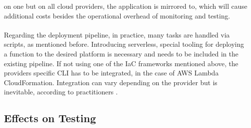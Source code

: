 \documentclass[a4paper,twoside,11pt, pagesize]{scrartcl}
\begin{document}
\begin{spacing}{1.2}
on one but on all cloud providers, the application is mirrored to, which will cause additional costs besides the operational overhead of monitoring and testing.\\\\ Regarding the deployment pipeline, in practice, many tasks are handled via scripts, as mentioned before. Introducing serverless, special tooling for deploying a function to the desired platform is necessary and needs to be included in the existing pipeline. If not using one of the IaC frameworks mentioned above, the providers specific CLI has to be integrated, in the case of AWS Lambda CloudFormation. Integration can vary depending on the provider but is inevitable, according to practitioners \cite{ivanov2018implementation}.
\subsection{Effects on Testing}

\end{spacing}
\end{document}
